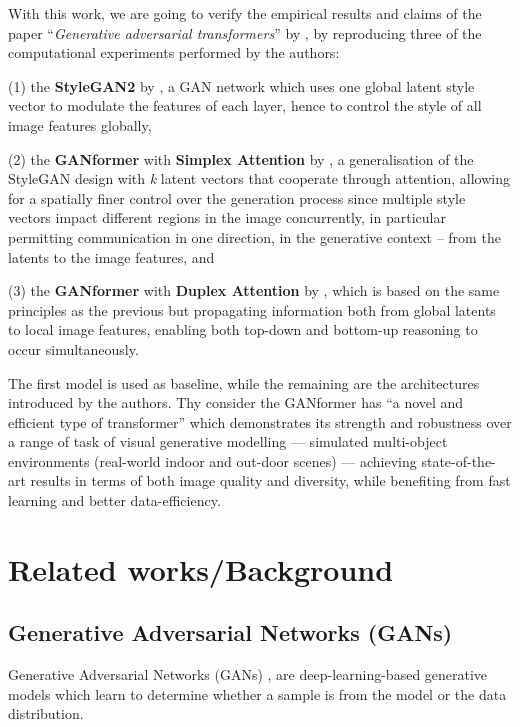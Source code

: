 \documentclass{article}
\begin{document}
	With this work, we are going to verify the empirical results and claims of the paper 
	``\emph{Generative adversarial transformers}'' by \citet{hudson2021generative}, by reproducing 
	three of the computational experiments performed by the authors:
	\begin{enumerate*}
		\item[(1)] the \textbf{StyleGAN2} by \citet{karras2020analyzing,karras2019style}, a GAN 
		network which uses one 
		global latent style vector to modulate the features of each layer, hence to control the style of all 
		image features globally,
		\item[(2)] the \textbf{GANformer} with \textbf{Simplex Attention} by 
		\citet{hudson2021generative}, a generalisation of the StyleGAN design with \textit{k} latent 
		vectors that cooperate through attention, allowing for a spatially finer control over the generation 
		process since multiple style vectors impact different regions in the image concurrently, in 
		particular permitting communication in one direction, in the generative context – from the latents 
		to the image features, and
		\item[(3)] the \textbf{GANformer} with \textbf{Duplex Attention} by \citet{hudson2021generative}, 
		which is based on the same principles as the previous but propagating information both from 
		global latents to local image features, enabling both top-down and bottom-up reasoning to occur 
		simultaneously.
	\end{enumerate*} 
	
	The first model is used as baseline, while the remaining are the architectures introduced by the 
	authors. Thy consider the GANformer has ``a novel and efficient type of transformer'' which 
	demonstrates its strength and robustness over a range of task of visual generative modelling —  
	simulated multi-object environments (real-world indoor and out-door scenes) — achieving 
	state-of-the-art results in terms of both image quality and diversity, while benefiting from fast 
	learning and better data-efficiency. 
	

	\section{Related works/Background}	
	
	\subsection{Generative Adversarial Networks (GANs)}\label{sec:gan}
	Generative Adversarial Networks (GANs) \cite{goodfellow2014generative}, are deep-learning-based 
	generative models which learn to determine whether a sample is from the model or the data 
	distribution. 
	
\end{document}
